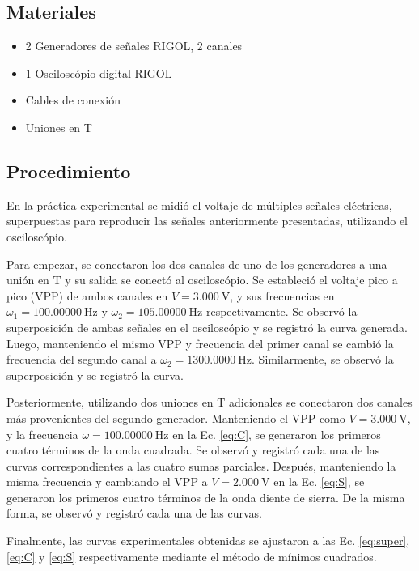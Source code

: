 \subsection*{Materiales}
\begin{itemize}
	\item 2 Generadores de señales RIGOL, 2 canales
	\item 1 Osciloscópio digital RIGOL
	\item Cables de conexión
	\item Uniones en T
\end{itemize}

\subsection*{Procedimiento}
En la práctica experimental se midió el voltaje de múltiples señales eléctricas,
superpuestas para reproducir las señales anteriormente presentadas, utilizando
el osciloscópio.

Para empezar, se conectaron los dos canales de uno de los generadores a una unión en T
y su salida se conectó al osciloscópio. Se estableció el voltaje pico a pico (VPP) de ambos
canales en $V=\qty{3.000}{\volt}$, y sus frecuencias en $\omega_1=\qty{100.00000}{\hertz}$
y  $\omega_2=\qty{105.00000}{\hertz}$ respectivamente. Se observó la superposición de ambas
señales en el osciloscópio y se registró la curva generada. Luego, manteniendo
el mismo VPP y frecuencia del primer canal se cambió la frecuencia del segundo canal
a $\omega_2=\qty{1300.0000}{\hertz}$. Similarmente, se observó la superposición y se
registró la curva.

Posteriormente, utilizando dos uniones en T adicionales se conectaron dos canales más
provenientes del segundo generador. Manteniendo el VPP como $V=\qty{3.000}{\volt}$, y
la frecuencia $\omega=\qty{100.00000}{\hertz}$ en la Ec. \ref{eq:C}, se generaron los
primeros cuatro términos de la onda cuadrada. Se observó y registró cada una de
las curvas correspondientes a las cuatro sumas parciales. Después, manteniendo la misma
frecuencia y cambiando el VPP a $V=\qty{2.000}{\volt}$ en la Ec. \ref{eq:S}, se generaron los
primeros cuatro términos de la onda diente de sierra. De la misma forma, se observó y registró cada una de las curvas.

Finalmente, las curvas experimentales obtenidas se ajustaron a las Ec. \ref{eq:super},
\ref{eq:C} y \ref{eq:S} respectivamente mediante el método de mínimos cuadrados.

\vspace{1cm}